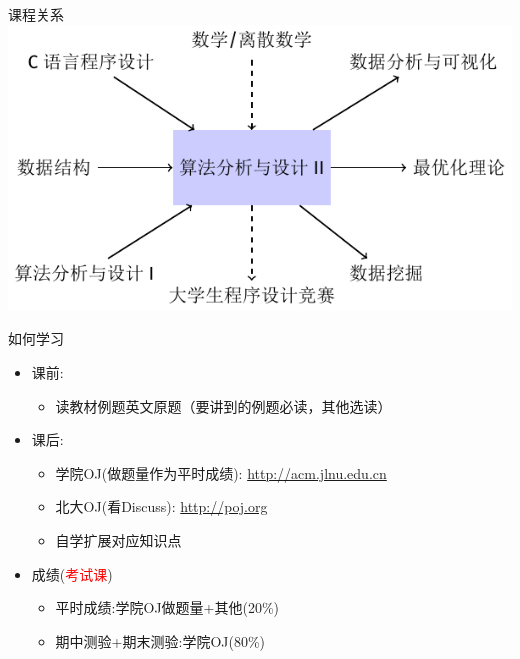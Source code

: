 \begin{frame}{课程关系}
    \includegraphics[center]{fig/1-1.pdf}
\end{frame}
\begin{frame}{如何学习}
    \begin{itemize}
        \item 课前:
        \begin{itemize}
            \item 读教材例题英文原题（要讲到的例题必读，其他选读）
        \end{itemize}
        \vfill
        \item 课后:
        \begin{itemize}
            \item 学院OJ(做题量作为平时成绩): \url{http://acm.jlnu.edu.cn}
            \item 北大OJ(看Discuss): \url{http://poj.org}
            \item 自学扩展对应知识点
        \end{itemize}
        \vfill
        \item 成绩(\textcolor{red}{考试课})
        \begin{itemize}
            \item 平时成绩:学院OJ做题量+其他(20\%)
            \item 期中测验+期末测验:学院OJ(80\%)
        \end{itemize}
    \end{itemize}
\end{frame}
